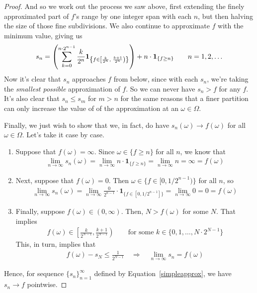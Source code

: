 \documentclass[12pt]{article}
\theoremstyle{plain}
\theoremstyle{definition}
\theoremstyle{remark}
\newcommand{\ra}{\rightarrow}
\newcommand{\one}[1]{\mathbf{1}_{#1}}
\newcommand{\ninf}{_{n=1}^\infty}
\begin{document}
\begin{proof}
And so we work out the process we saw above, first extending the finely
approximated part of $f$'s range by one integer span with each $n$, but
then halving the size of those fine subdivisions. We also continue to
approximate $f$ with the minimum value, giving us
\begin{align}
  s_n = \left(
  \sum^{n\cdot 2^{n-1}}_{k=0}\frac{k}{2^{n}}
  \one{%
    \left\{
      f\in \left[\frac{k}{2^{n}}, \; \frac{k+1}{2^{n}}\right)
    \right\}
  }
  \right)
  + n \cdot \one{\{f\geq n\}}
  \qquad n=1,2,\ldots
  \label{simpleapprox}
\end{align}
Now it's clear that $s_n$ approaches $f$ from below, since with each
$s_n$, we're taking the \emph{smallest possible} approximation of $f$.
So we can never have $s_n>f$ for any $f$. It's also clear that $s_n\leq
s_m$ for $m>n$ for the same reasons that a finer partition can only
increase the value of of the approximation at an $\omega\in\Omega$.

Finally, we just wish to show that we, in fact, do have
$s_n(\omega)\rightarrow f(\omega)$ for all $\omega\in \Omega$. Let's
take it case by case.
\begin{enumerate}[label=(\roman*)]
  \item Suppose that $f(\omega)=\infty$. Since $\omega\in \{f\geq n\}$
    for all $n$, we know that
    \begin{align*}
      \lim_{n\rightarrow\infty} s_n(\omega)
      = \lim_{n\rightarrow\infty}
      n\cdot\one{\{f\geq n\}}
      = \lim_{n\rightarrow\infty} n = \infty = f(\omega)
    \end{align*}
  \item Next, suppose that $f(\omega) = 0$. Then
    $\omega\in \big\{f \in [0,1/2^{n-1})\big\}$ for all $n$, so
    \begin{align*}
      \lim_{n\rightarrow\infty} s_n(\omega)
      = \lim_{n\rightarrow\infty}
      \frac{0}{2^{n-1}}\cdot\one{\{f\in[0,1/2^{n-1}]\}} =
      \lim_{n\rightarrow\infty} 0 = 0 = f(\omega)
    \end{align*}
  \item Finally, suppose $f(\omega)\in(0,\infty)$. Then, $N>f(\omega)$
    for some $N$. That implies
    \begin{align*}
      f(\omega) \in \left[\frac{k}{2^{N-1}}, \frac{k+1}{2^{N-1}}\right)
          \qquad
      \text{for some $k\in\{0,1,\ldots,N\cdot 2^{N-1}\}$}
    \end{align*}
    This, in turn, implies that
    \begin{align*}
      f(\omega) - s_N \leq \frac{1}{2^{N-1}}
      \quad \Rightarrow\quad
      \lim_{n\rightarrow\infty}  s_n  =
      f(\omega)
    \end{align*}
\end{enumerate}
Hence, for sequence $\{s_n\}\ninf$ defined by
Equation~\ref{simpleapprox}, we have $s_n\ra f$ pointwise.
\end{proof}
\end{document}
